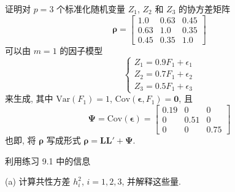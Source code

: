 
\quad 证明对 $p=3$ 个标准化随机变量 $Z_1$, $Z_2$ 和 $Z_3$ 的协方差矩阵
\[
\boldsymbol{\rho}=\begin{bmatrix}1.0&0.63&0.45\\0.63&1.0&0.35\\0.45&0.35&1.0\end{bmatrix}
\]
可以由 $m=1$ 的因子模型
\[
\left\{\begin{array}{l}
Z_1=0.9F_1+\epsilon_1\\
Z_2=0.7F_1+\epsilon_2\\
Z_3=0.5F_1+\epsilon_3
\end{array}\right.
\]
来生成, 其中 $\mathrm{Var}(F_1)=1$, $\mathrm{Cov}(\boldsymbol{\epsilon},F_1)=\mathbf{0}$, 且
\[
\boldsymbol{\Psi}=\mathrm{Cov}(\boldsymbol{\epsilon})=\begin{bmatrix}0.19&0&0\\0&0.51&0\\0&0&0.75\end{bmatrix}
\]
也即, 将 $\boldsymbol{\rho}$ 写成形式 $\boldsymbol{\rho}=\mathbf{L}\mathbf{L}'+\boldsymbol{\Psi}$.

\quad 利用练习 9.1 中的信息

(a) 计算共性方差 $h_i^2$, $i=1,2,3$, 并解释这些量.
